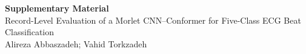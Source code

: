 \documentclass[11pt,a4paper]{article}
\begin{document}
\begin{center}
{\Large\bfseries Supplementary Material}\\[0.4cm]
{\large Record-Level Evaluation of a Morlet CNN--Conformer for Five-Class ECG Beat Classification}\\[0.25cm]
Alireza Abbaszadeh; Vahid Torkzadeh
\end{center}
\vspace{0.5cm}


\end{document}

